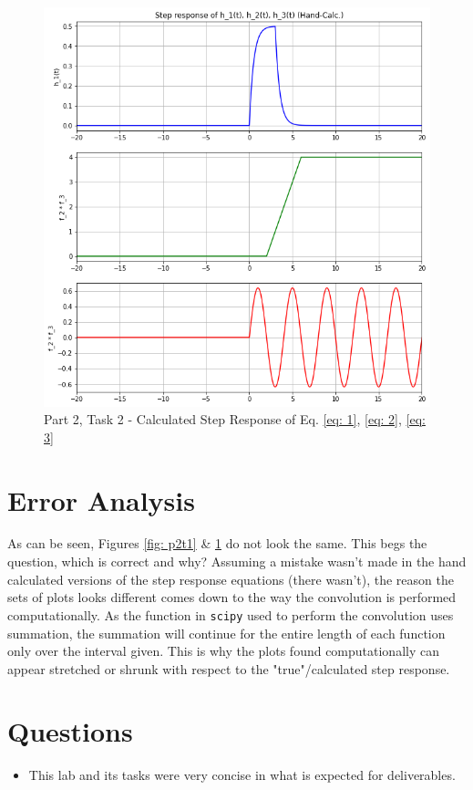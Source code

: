 \documentclass[12pt]{report}
\begin{document}
\begin{figure}[h!]
  \centering
  \includegraphics[scale=0.5]{p2t2.png}
  \caption{Part 2, Task 2 - Calculated Step Response of Eq. \eqref{eq: 1}, \eqref{eq: 2}, \eqref{eq: 3}}
  \label{fig: p2t2}
\end{figure}
\section{Error Analysis}\label{section: ErAn}
As can be seen, Figures \ref{fig: p2t1} \& \ref{fig: p2t2} do not look the same. This begs the question, which is correct and why?
Assuming a mistake wasn't made in the hand calculated versions of the step response equations (there wasn't), the reason the sets of plots looks different comes down
to the way the convolution is performed computationally. As the function in \texttt{scipy} used to perform the convolution uses summation, the summation will continue
for the entire length of each function only over the interval given. This is why the plots found computationally can appear stretched or shrunk with respect to the
"true"/calculated step response. 
\section{Questions}
\begin{itemize}
  \item This lab and its tasks were very concise in what is expected for deliverables.
\end{itemize}
\end{document}
